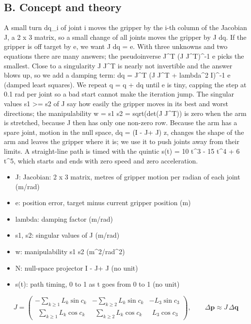 \documentclass[11pt,a4paper]{article}
\begin{document}
\subsection*{B. Concept and theory}
A small turn dq\_i of joint i moves the gripper by the i-th column of the Jacobian J, a 2 x 3 matrix, so a small change of all joints moves the gripper by J dq. If the gripper is off target by e, we want J dq = e. With three unknowns and two equations there are many answers; the pseudoinverse J\textasciicircum{}T (J J\textasciicircum{}T)\textasciicircum{}-1 e picks the smallest. Close to a singularity J J\textasciicircum{}T is nearly not invertible and the answer blows up, so we add a damping term: dq = J\textasciicircum{}T (J J\textasciicircum{}T + lambda\textasciicircum{}2 I)\textasciicircum{}-1 e (damped least squares). We repeat q = q + dq until e is tiny, capping the step at 0.1 rad per joint so a bad start cannot make the iteration jump. The singular values s1 \textgreater{}= s2 of J say how easily the gripper moves in its best and worst directions; the manipulability w = s1 s2 = sqrt(det(J J\textasciicircum{}T)) is zero when the arm is stretched, because J then has only one non-zero row. Because the arm has a spare joint, motion in the null space, dq = (I - J+ J) z, changes the shape of the arm and leaves the gripper where it is; we use it to push joints away from their limits. A straight-line path is timed with the quintic s(t) = 10 t\textasciicircum{}3 - 15 t\textasciicircum{}4 + 6 t\textasciicircum{}5, which starts and ends with zero speed and zero acceleration.

\begin{itemize}[nosep]
\item J: Jacobian: 2 x 3 matrix, metres of gripper motion per radian of each joint (m/rad)
\item e: position error, target minus current gripper position (m)
\item lambda: damping factor (m/rad)
\item s1, s2: singular values of J (m/rad)
\item w: manipulability s1 s2 (m\textasciicircum{}2/rad\textasciicircum{}2)
\item N: null-space projector I - J+ J (no unit)
\item s(t): path timing, 0 to 1 as t goes from 0 to 1 (no unit)
\end{itemize}

\begin{equation*}
J=\begin{pmatrix}-\sum_{k\ge1}L_k\sin c_k & -\sum_{k\ge2}L_k\sin c_k & -L_3\sin c_3\\ \ \ \sum_{k\ge1}L_k\cos c_k & \ \ \sum_{k\ge2}L_k\cos c_k & \ \ L_3\cos c_3\end{pmatrix},\qquad \Delta\mathbf p\approx J\,\Delta\mathbf q
\end{equation*}
\end{document}
